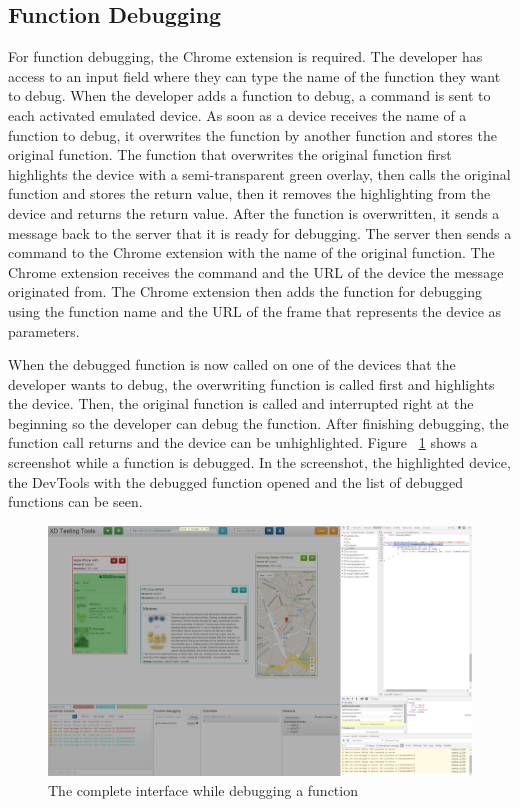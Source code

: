 \subsection{Function Debugging}

For function debugging, the Chrome extension is required. The developer has access to an input field where they can type the name of the function they want to debug. When the developer adds a function to debug, a command is sent to each activated emulated device. As soon as a device receives the name of a function to debug, it overwrites the function by another function and stores the original function. The function that overwrites the original function first highlights the device with a semi-transparent green overlay, then calls the original function and stores the return value, then it removes the highlighting from the device and returns the return value. After the function is overwritten, it sends a message back to the server that it is ready for debugging. The server then sends a command to the Chrome extension with the name of the original function. The Chrome extension receives the command and the URL of the device the message originated from. The Chrome extension then adds the function for debugging using the function name and the URL of the frame that represents the device as parameters. 

When the debugged function is now called on one of the devices that the developer wants to debug, the overwriting function is called first and highlights the device. Then, the original function is called and interrupted right at the beginning so the developer can debug the function. After finishing debugging, the function call returns and the device can be unhighlighted. Figure ~\ref{fig:function_debugging_complete} shows a screenshot while a function is debugged. In the screenshot, the highlighted device, the DevTools with the debugged function opened and the list of debugged functions can be seen.

\begin{figure}[H]
  \centering
    \includegraphics[width=1.0\textwidth]{images/screenshots/function_debugging_complete.png}
	\caption{The complete interface while debugging a function}
	\label{fig:function_debugging_complete}
\end{figure}


